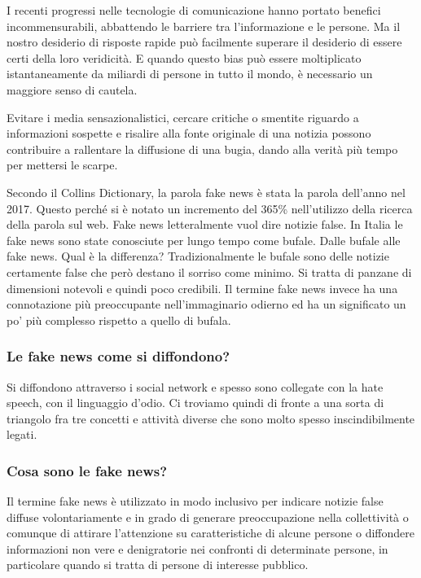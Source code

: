\begin{itshape}
I recenti progressi nelle tecnologie di comunicazione hanno portato benefici incommensurabili, abbattendo le barriere tra l’informazione e le persone. Ma il nostro desiderio di risposte rapide può facilmente superare il desiderio di essere certi della loro veridicità. E quando questo bias può essere moltiplicato istantaneamente da miliardi di persone in tutto il mondo, è necessario un maggiore senso di cautela.

Evitare i media sensazionalistici, cercare critiche o smentite riguardo a informazioni sospette e risalire alla fonte originale di una notizia possono contribuire a rallentare la diffusione di una bugia, dando alla verità più tempo per mettersi le scarpe.
\end{itshape}

Secondo il Collins Dictionary, la parola fake news è stata la parola dell'anno nel 2017. Questo perché si è notato un incremento del 365\% nell'utilizzo della ricerca della parola sul web. 
Fake news letteralmente vuol dire notizie false. In Italia le fake news sono state conosciute per lungo tempo come bufale. 
Dalle bufale alle fake news. Qual è la differenza? Tradizionalmente le bufale sono delle notizie certamente false che però destano il sorriso come minimo. Si tratta di panzane di dimensioni notevoli e quindi poco credibili. Il termine fake news invece ha una connotazione più preoccupante nell'immaginario odierno ed ha un significato un po' più complesso rispetto a quello di bufala.

\subsubsection{Le fake news come si diffondono?} 
Si diffondono attraverso i social network e spesso sono collegate con la hate speech, con il linguaggio d'odio. Ci troviamo quindi di fronte a una sorta di triangolo fra tre concetti e attività diverse che sono molto spesso inscindibilmente legati. 

\subsubsection{Cosa sono le fake news?}
Il termine fake news è utilizzato in modo inclusivo per indicare notizie false diffuse volontariamente e in grado di generare preoccupazione nella collettività o comunque di attirare l'attenzione su caratteristiche di alcune persone o diffondere informazioni non vere e denigratorie nei confronti di determinate persone, in particolare quando si tratta di persone di interesse pubblico.

